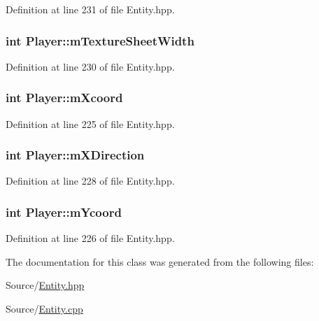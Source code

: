 Definition at line 231 of file Entity.\-hpp.

\hypertarget{class_player_abdccfacdffb3a21371af39dbe0255453}{
\subsubsection[{m\-Texture\-Sheet\-Width}]{\setlength{\rightskip}{0pt plus 5cm}int Player\-::m\-Texture\-Sheet\-Width\hspace{0.3cm}{\ttfamily [protected]}}}\label{class_player_abdccfacdffb3a21371af39dbe0255453}


Definition at line 230 of file Entity.\-hpp.

\hypertarget{class_player_ab5f657ba805e70319fc312533d715d96}{
\subsubsection[{m\-Xcoord}]{\setlength{\rightskip}{0pt plus 5cm}int Player\-::m\-Xcoord\hspace{0.3cm}{\ttfamily [protected]}}}\label{class_player_ab5f657ba805e70319fc312533d715d96}


Definition at line 225 of file Entity.\-hpp.

\hypertarget{class_player_a141ca66b2ec828bb84617b21dc7e9db0}{
\subsubsection[{m\-X\-Direction}]{\setlength{\rightskip}{0pt plus 5cm}int Player\-::m\-X\-Direction\hspace{0.3cm}{\ttfamily [protected]}}}\label{class_player_a141ca66b2ec828bb84617b21dc7e9db0}


Definition at line 228 of file Entity.\-hpp.

\hypertarget{class_player_ab3a89b65abf92da672ebc3c55b22dc80}{
\subsubsection[{m\-Ycoord}]{\setlength{\rightskip}{0pt plus 5cm}int Player\-::m\-Ycoord\hspace{0.3cm}{\ttfamily [protected]}}}\label{class_player_ab3a89b65abf92da672ebc3c55b22dc80}


Definition at line 226 of file Entity.\-hpp.



The documentation for this class was generated from the following files\-:\begin{DoxyCompactItemize}
\item 
Source/\hyperlink{_entity_8hpp}{Entity.\-hpp}\item 
Source/\hyperlink{_entity_8cpp}{Entity.\-cpp}\end{DoxyCompactItemize}
